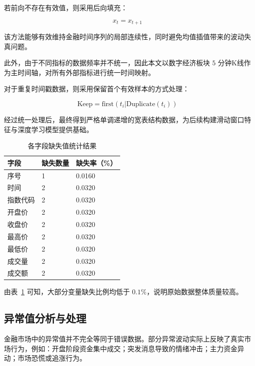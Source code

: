 \documentclass[withoutpreface,bwprint]{cumcmthesis}
\begin{document}
若前向不存在有效值，则采用后向填充：

\begin{equation}
x_t=x_{t+1}
\end{equation}

该方法能够有效维持金融时间序列的局部连续性，同时避免均值插值带来的波动失真问题。

此外，由于不同指标的数据频率并不统一，因此本文以数字经济板块 $5$ 分钟K线作为主时间轴，对所有外部指标进行统一时间映射。

对于重复时间戳数据，则采用保留首个有效样本的方式处理：

\begin{equation}
\text{Keep}=\text{first}(t_i|\text{Duplicate}(t_i))
\end{equation}

经过统一处理后，最终得到严格单调递增的宽表结构数据，为后续构建滑动窗口特征与深度学习模型提供基础。

\begin{table}[H]
    \centering
    \small
    \caption{各字段缺失值统计结果}
    \label{tab:missing_values}
    \begin{tabular}{p{4cm}<{\centering}p{3.5cm}<{\centering}p{3.5cm}<{\centering}}
        \toprule[1.5pt]
        字段 & 缺失数量 & 缺失率（\%）\\
        \midrule[1pt]
        序号 & 1 & 0.0160 \\
        时间 & 2 & 0.0320 \\
        指数代码 & 2 & 0.0320 \\
        开盘价 & 2 & 0.0320 \\
        收盘价 & 2 & 0.0320 \\
        最高价 & 2 & 0.0320 \\
        最低价 & 2 & 0.0320 \\
        成交量 & 2 & 0.0320 \\
        成交额 & 2 & 0.0320 \\
        \bottomrule[1.5pt]
    \end{tabular}
\end{table}

由表~\ref{tab:missing_values} 可知，大部分变量缺失比例均低于 $0.1\%$，说明原始数据整体质量较高。

\subsection{异常值分析与处理}

金融市场中的异常值并不完全等同于错误数据。部分异常波动实际上反映了真实市场行为，例如：开盘阶段资金集中成交；突发消息导致的情绪冲击；主力资金异动；市场恐慌或追涨行为。
\end{document}
